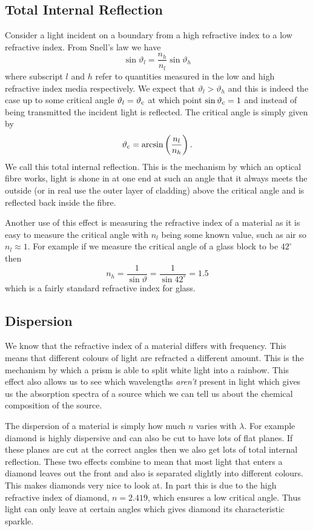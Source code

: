     \subsection{Total Internal Reflection}
    Consider a light incident on a boundary from a high refractive index to a low refractive index.
    From Snell's law we have
    \[\sin\vartheta_l = \frac{n_h}{n_l}\sin\vartheta_h\]
    where subscript \(l\) and \(h\) refer to quantities measured in the low and high refractive index media respectively.
    We expect that \(\vartheta_l > \vartheta_h\) and this is indeed the case up to some critical angle \(\vartheta_l = \vartheta_{\mathrm{c}}\) at which point \(\sin\vartheta_{\mathrm{c}} = 1\) and instead of being transmitted the incident light is reflected.
    The critical angle is simply given by
    \[\vartheta_{\mathrm{c}} = \arcsin\left( \frac{n_l}{n_h} \right).\]
    We call this total internal reflection.
    This is the mechanism by which an optical fibre works, light is shone in at one end at such an angle that it always meets the outside (or in real use the outer layer of cladding) above the critical angle and is reflected back inside the fibre.
    
    Another use of this effect is measuring the refractive index of a material as it is easy to measure the critical angle with \(n_l\) being some known value, such as air so \(n_l \approx 1\).
    For example if we measure the critical angle of a glass block to be \(42^\circ\) then
    \[n_h = \frac{1}{\sin\vartheta} = \frac{1}{\sin 42^\circ} = 1.5\]
    which is a fairly standard refractive index for glass.
    
    \subsection{Dispersion}
    We know that the refractive index of a material differs with frequency.
    This means that different colours of light are refracted a different amount.
    This is the mechanism by which a prism is able to split white light into a rainbow.
    This effect also allows us to see which wavelengths \emph{aren't} present in light which gives us the absorption spectra of a source which we can tell us about the chemical composition of the source.
    
    The dispersion of a material is simply how much \(n\) varies with \(\lambda\).
    For example diamond is highly dispersive and can also be cut to have lots of flat planes.
    If these planes are cut at the correct angles then we also get lots of total internal reflection.
    These two effects combine to mean that most light that enters a diamond leaves out the front and also is separated slightly into different colours.
    This makes diamonds very nice to look at.
    In part this is due to the high refractive index of diamond, \(n = 2.419\), which ensures a low critical angle.
    Thus light can only leave at certain angles which gives diamond its characteristic sparkle.
    
